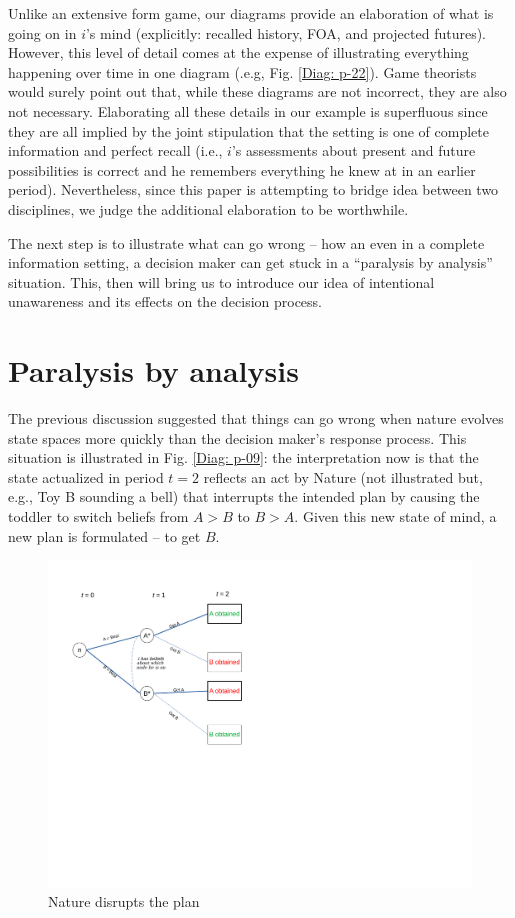 \documentclass[
11pt,
titlepage,
reqno,
]{article}%
\theoremstyle{definition}
\begin{document}
Unlike an extensive form game, our diagrams provide an elaboration of what is going on in $i$'s mind (explicitly: recalled history, FOA, and projected futures). However, this level of detail comes at the expense of illustrating everything happening over time in one diagram (.e.g,  Fig. \ref{Diag: p-22}). Game theorists would surely point out that, while these diagrams are not incorrect, they are also not necessary. Elaborating all these details in our example is superfluous since they are all implied by the joint stipulation that the setting is one of complete information and perfect recall (i.e., $i$'s assessments about present and future possibilities is correct and he remembers everything he knew at in an earlier period). Nevertheless, since this paper is attempting to bridge idea between two disciplines, we judge the additional elaboration to be worthwhile. 

The next step is to illustrate what can go wrong -- how an even in a complete information setting, a decision maker can get stuck in a ``paralysis by analysis'' situation. This, then will bring us to introduce our idea of intentional unawareness and its  effects on the decision process.

\section*{Paralysis by analysis}
The previous discussion suggested that things can go wrong when nature evolves state spaces more quickly than the decision maker's response process. This situation is illustrated in Fig. \ref{Diag: p-09}: the interpretation now is that the state actualized in period $t=2$ reflects an act by Nature (not illustrated but, e.g., Toy B sounding a bell) that interrupts the intended plan by causing the toddler to switch beliefs from $A>B$ to $B>A$. Given this new state of mind, a new plan is formulated -- to get $B$.

\begin{figure}[h!]
	\centering
	\includegraphics*[page=10,trim = 0 3.5in 0in 0in,scale=.65]{Awareness_Diagrams_All}
	\caption{Nature disrupts the plan\label{Diag: p-10}}%
\end{figure}
\end{document}
